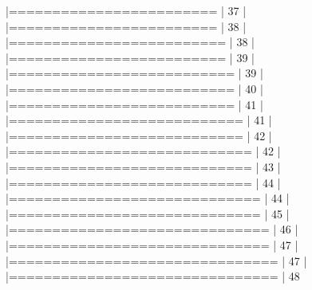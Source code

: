 \documentclass[10pt]{article}
\newenvironment{CodeChunk}{}{}
\begin{document}
\begin{CodeChunk}
\begin{CodeChunk}
\begin{CodeOutput}
  |========================                                         |  37%
  |                                                                       
  |========================                                         |  38%
  |                                                                       
  |=========================                                        |  38%
  |                                                                       
  |=========================                                        |  39%
  |                                                                       
  |==========================                                       |  39%
  |                                                                       
  |==========================                                       |  40%
  |                                                                       
  |==========================                                       |  41%
  |                                                                       
  |===========================                                      |  41%
  |                                                                       
  |===========================                                      |  42%
  |                                                                       
  |============================                                     |  42%
  |                                                                       
  |============================                                     |  43%
  |                                                                       
  |============================                                     |  44%
  |                                                                       
  |=============================                                    |  44%
  |                                                                       
  |=============================                                    |  45%
  |                                                                       
  |==============================                                   |  46%
  |                                                                       
  |==============================                                   |  47%
  |                                                                       
  |===============================                                  |  47%
  |                                                                       
  |===============================                                  |  48%

\end{CodeOutput}
\end{CodeChunk}
\end{CodeChunk}
\end{document}
